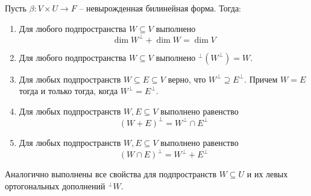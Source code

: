 \begin{claim}
\label{claim::DualitySpaces}
Пусть $\beta\colon V\times U\to F$ -- невырожденная билинейная форма.
Тогда:
\begin{enumerate}
\item Для любого подпространства $W\subseteq V$ выполнено
\[
\dim W^\bot + \dim W = \dim V
\]

\item Для любого подпространства $W\subseteq V$ выполнено ${}^\bot(W^\bot) = W$.

\item Для любых подпространств $W\subseteq E\subseteq V$ верно, что $W^\bot \supseteq E^\bot$.
Причем $W = E$ тогда и только тогда, когда $W^\bot = E^\bot$.

\item Для любых подпространств $W, E\subseteq V$ выполнено равенство
\[
(W + E)^\bot = W^\bot \cap E^\bot
\]

\item Для любых подпространств $W, E\subseteq V$ выполнено равенство
\[
(W\cap E)^\bot = W^\bot + E^\bot
\]
\end{enumerate}
Аналогично выполнены все свойства для подпространств $W\subseteq U$ и их левых ортогональных дополнений ${}^\bot W$.
\end{claim}
